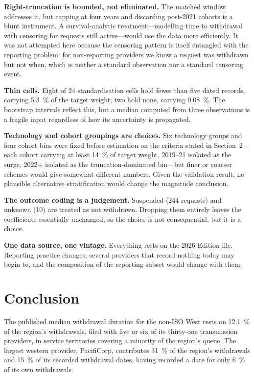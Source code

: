 \documentclass[11pt,a4paper]{article}
\begin{document}
\textbf{Right-truncation is bounded, not eliminated.} The matched window
addresses it, but capping at four years and discarding post-2021 cohorts is a
blunt instrument. A survival-analytic treatment---modelling time to withdrawal
with censoring for requests still active---would use the data more efficiently.
It was not attempted here because the censoring pattern is itself entangled with
the reporting problem: for non-reporting providers we know a request was
withdrawn but not when, which is neither a standard observation nor a standard
censoring event.

\textbf{Thin cells.} Eight of 24 standardisation cells hold fewer than five dated
records, carrying \SI{5.3}{\percent} of the target weight; two hold none,
carrying \SI{0.08}{\percent}. The bootstrap intervals reflect this, but a median
computed from three observations is a fragile input regardless of how its
uncertainty is propagated.

\textbf{Technology and cohort groupings are choices.} Six technology groups and
four cohort bins were fixed before estimation on the criteria stated in
Section~2---each cohort carrying at least \SI{14}{\percent} of target weight,
2019--21 isolated as the surge, 2022+ isolated as the truncation-dominated
bin---but finer or coarser schemes would give somewhat different numbers. Given
the validation result, no plausible alternative stratification would change the
magnitude conclusion.

\textbf{The outcome coding is a judgement.} Suspended (244 requests) and unknown
(10) are treated as not withdrawn. Dropping them entirely leaves the coefficients
essentially unchanged, so the choice is not consequential, but it is a choice.

\textbf{One data source, one vintage.} Everything rests on the 2026 Edition file.
Reporting practice changes; several providers that record nothing today may begin
to, and the composition of the reporting subset would change with them.

\section{Conclusion}

The published median withdrawal duration for the non-ISO West rests on
\SI{12.1}{\percent} of the region's withdrawals, filed with five or six of its
thirty-one transmission providers, in service territories covering a minority of
the region's queue. The largest western provider, PacifiCorp, contributes
\SI{31}{\percent} of the region's withdrawals and \SI{15}{\percent} of its
recorded withdrawal dates, having recorded a date for only \SI{6}{\percent} of
its own withdrawals.
\end{document}
